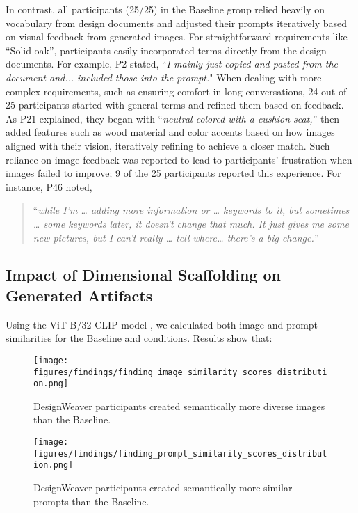 In contrast, all participants (25/25) in the Baseline group relied heavily on vocabulary from design documents and adjusted their prompts iteratively based on visual feedback from generated images. For straightforward requirements like ``Solid oak'', participants easily incorporated terms directly from the design documents. For example, P2 stated, ``\textit{I mainly just copied and pasted from the document and... included those into the prompt.}" When dealing with more complex requirements, such as ensuring comfort in long conversations, 24 out of 25 participants started with general terms and refined them based on feedback. As P21 explained, they began with ``\textit{neutral colored with a cushion seat,}'' then added features such as wood material and color accents based on how images aligned with their vision, iteratively refining to achieve a closer match. Such reliance on image feedback was reported to lead to participants' frustration when images failed to improve; 9 of the 25 participants reported this experience. For instance, P46 noted, \begin{quote}``\textit{while I'm … adding more information or … keywords to it, but sometimes … some keywords later, it doesn't change that much. It just gives me some new pictures, but I can't really … tell where… there's a big change.}''\end{quote}


\subsection{Impact of Dimensional Scaffolding on Generated Artifacts}
\label{finding6.2:image_novelty}
Using the ViT-B/32 CLIP model \cite{radford2021learning}, we calculated both image and prompt similarities for the Baseline and \toolname{} conditions. Results show that:

\begin{figure}[htbp]
    \centering
    \texttt{[image: figures/findings/finding\_image\_similarity\_scores\_distribution.png]}
    \caption{DesignWeaver participants created semantically more diverse images than the Baseline.}
    \label{fig:finding_image_similarity_scores_distribution}
\end{figure}

\begin{figure}[htbp]
    \centering
    \texttt{[image: figures/findings/finding\_prompt\_similarity\_scores\_distribution.png]}
    \caption{DesignWeaver participants created semantically more similar prompts than the Baseline.}
    \label{fig:finding_prompt_similarity_scores_distribution}
\end{figure}


